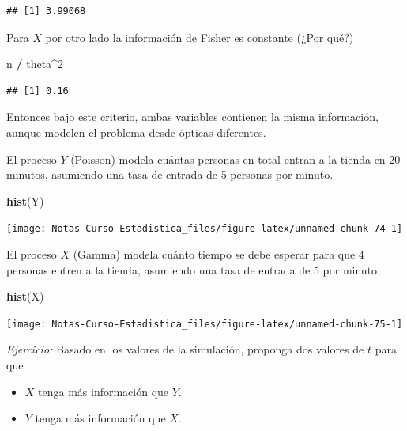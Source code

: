 \documentclass[
  12pt,
]{book}
\newenvironment{Shaded}{\begin{snugshade}}{\end{snugshade}}
\newcommand{\DecValTok}[1]{\textcolor[rgb]{0.00,0.00,0.81}{#1}}
\newcommand{\KeywordTok}[1]{\textcolor[rgb]{0.13,0.29,0.53}{\textbf{#1}}}
\newcommand{\NormalTok}[1]{#1}
\newcommand{\OperatorTok}[1]{\textcolor[rgb]{0.81,0.36,0.00}{\textbf{#1}}}
\newcommand{\StringTok}[1]{\textcolor[rgb]{0.31,0.60,0.02}{#1}}
\providecommand{\tightlist}{%
  \setlength{\itemsep}{0pt}\setlength{\parskip}{0pt}}
\begin{document}
\begin{verbatim}
## [1] 3.99068
\end{verbatim}

Para \(X\) por otro lado la información de Fisher es constante (¿Por qué?)

\begin{Shaded}
\begin{Highlighting}[]
\NormalTok{n }\OperatorTok{/}\StringTok{ }\NormalTok{theta}\OperatorTok{\^{}}\DecValTok{2}
\end{Highlighting}
\end{Shaded}

\begin{verbatim}
## [1] 0.16
\end{verbatim}

Entonces bajo este criterio, ambas variables contienen la misma información,
aunque modelen el problema desde ópticas diferentes.

El proceso \(Y\) (Poisson) modela cuántas personas en total entran a la tienda en 20 minutos, asumiendo una tasa de entrada de 5 personas por minuto.

\begin{Shaded}
\begin{Highlighting}[]
\KeywordTok{hist}\NormalTok{(Y)}
\end{Highlighting}
\end{Shaded}

\begin{center}\texttt{[image: Notas-Curso-Estadistica\_files/figure-latex/unnamed-chunk-74-1]} \end{center}

El proceso \(X\) (Gamma) modela cuánto tiempo se debe esperar para que 4 personas entren a la tienda, asumiendo una tasa de entrada de 5 por minuto.

\begin{Shaded}
\begin{Highlighting}[]
\KeywordTok{hist}\NormalTok{(X)}
\end{Highlighting}
\end{Shaded}

\begin{center}\texttt{[image: Notas-Curso-Estadistica\_files/figure-latex/unnamed-chunk-75-1]} \end{center}

\emph{Ejercicio:} Basado en los valores de la simulación, proponga dos valores de \(t\) para que

\begin{itemize}
\tightlist
\item
  \(X\) tenga más información que \(Y\).
\item
  \(Y\) tenga más información que \(X\).
\end{itemize}
\end{document}
